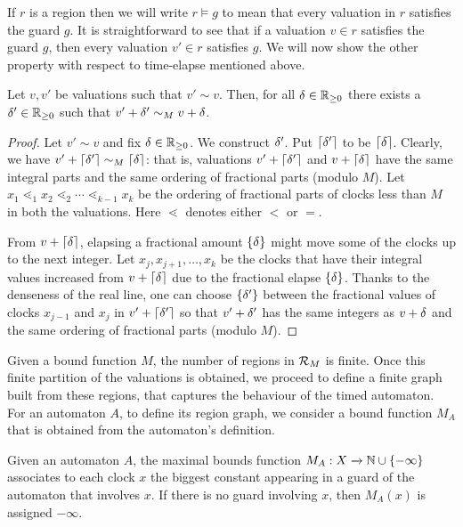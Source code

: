 If $r$ is a region then we will write $r \models g$ to mean that every valuation in $r$ satisfies the guard $g$. It is straightforward to see that if a valuation $v \in r$ satisfies the guard $g$, then every valuation $v' \in r$ satisfies $g$. We will now show the other property with respect to time-elapse mentioned above.

\begin{lemma}
Let $v, v'$ be valuations such that $v' \sim v$. Then, for all $\delta \in \mathbb{R}_{\ge 0}$ there exists a $\delta' \in \mathbb{R}_{\ge 0}$ such that $v' + \delta' \sim_M v + \delta$.
\end{lemma}

\begin{proof}
Let $v' \sim v$ and fix $\delta \in \mathbb{R}_{\ge 0}$. We construct $\delta'$. Put $\lceil \delta' \rceil$ to be $\lceil \delta \rceil$. Clearly, we have $v' + \lceil \delta' \rceil \sim_M \lceil \delta \rceil$: that is, valuations $v' + \lceil \delta' \rceil$ and $v + \lceil \delta \rceil$ have the same integral parts and the same ordering of fractional parts (modulo $M$). Let $x_1 \lessdot_1 x_2 \lessdot_2 \cdots \lessdot_{k - 1} x_k$ be the ordering of fractional parts of clocks less than $M$ in both the valuations. Here $\lessdot$ denotes either $<$ or $=$. 

From $v + \lceil \delta \rceil$, elapsing a fractional amount $\{\delta\}$ might move some of the clocks up to the next integer. Let $x_j, x_{j + 1}, \dots, x_k$ be the clocks that have their integral values increased from $v + \lceil \delta \rceil$ due to the fractional elapse $\{\delta\}$. Thanks to the denseness of the real line, one can choose $\{\delta'\}$ between the fractional values of clocks $x_{j - 1}$ and $x_j$ in $v' + \lceil \delta' \rceil$ so that $v' + \delta'$ has the same integers as $v + \delta$ and the same ordering of fractional parts (modulo $M$).
\end{proof}

Given a bound function $M$, the number of regions in ${\mathcal R}_M$ is finite. Once this finite partition of the valuations is obtained, we proceed to define a finite graph built from these regions, that captures the behaviour of the timed automaton. For an automaton $A$, to define its region graph, we consider a bound function $M_A$ that is obtained from the automaton’s definition.

\begin{definition}
Given an automaton $A$, the maximal bounds function $M_A: X \xrightarrow{} \mathbb{N} \cup \{-\infty\}$ associates to each clock $x$ the biggest constant appearing in a guard of the automaton that involves $x$. If there is no guard involving $x$, then $M_A(x)$ is assigned $-\infty$.
\end{definition}

